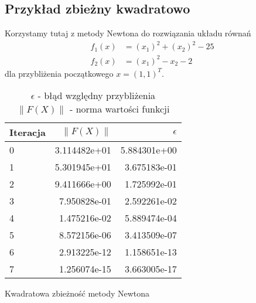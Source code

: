 \documentclass[11pt,wide]{mwart}
\begin{document}
\subsection{Przykład zbieżny kwadratowo}
Korzystamy tutaj z metody Newtona do rozwiązania układu równań
\begin{align*}
	f_1(x) &= (x_1)^2 + (x_2)^2 - 25 \\
	f_2(x) &= (x_1)^2 - x_2 - 2
\end{align*}
dla przybliżenia początkowego $ x = (1, 1)^T $.
\begin{table}[h]
\centering
\begin{tabular}{| l | r | r |} \hline
Iteracja & $\|F(X)\|$ & $\epsilon$ \\ \hline
0 & 3.114482e+01 & 5.884301e+00 \\ \hline
1 & 5.301945e+01 & 3.675183e-01 \\ \hline
2 & 9.411666e+00 & 1.725992e-01 \\ \hline
3 & 7.950828e-01 & 2.592261e-02 \\ \hline
4 & 1.475216e-02 & 5.889474e-04 \\ \hline
5 & 8.572156e-06 & 3.413509e-07 \\ \hline
6 & 2.913225e-12 & 1.158651e-13 \\ \hline
7 & 1.256074e-15 & 3.663005e-17 \\ \hline
\end{tabular}
\caption{Kwadratowa zbieżność metody Newtona}
\caption*{$ \epsilon $ - błąd względny przybliżenia\\$\|F(X)\|$ - norma wartości funkcji}
\end{table}
\end{document}
